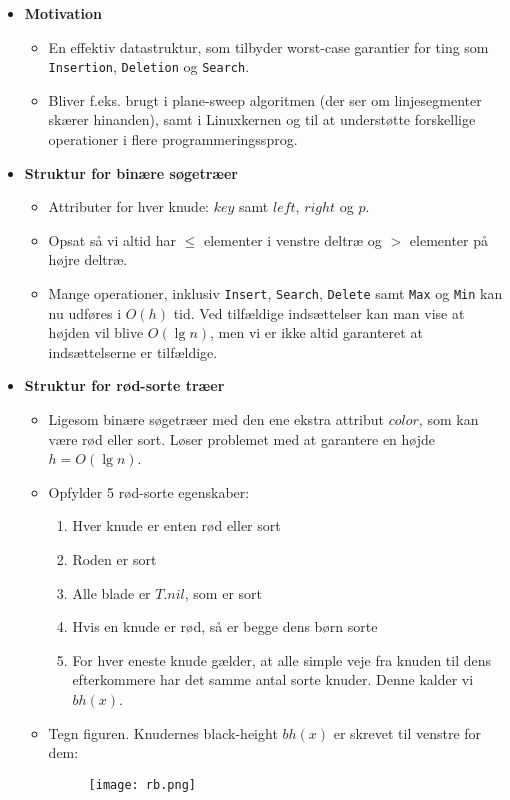 \begin{itemize}
\item \textbf{Motivation}
\begin{itemize}
	\item En effektiv datastruktur, som tilbyder worst-case garantier for ting som \texttt{Insertion}, \texttt{Deletion} og \texttt{Search}.
	\item Bliver f.eks. brugt i plane-sweep algoritmen (der ser om linjesegmenter skærer hinanden), samt i Linuxkernen og til at understøtte forskellige operationer i flere programmeringssprog.
\end{itemize}
	
	
\item \textbf{Struktur for binære søgetræer}
\begin{itemize}
	\item Attributer for hver knude: $key$ samt $left$, $right$ og $p$.
	\item Opsat så vi altid har $\leq$ elementer i venstre deltræ og $>$ elementer på højre deltræ.
	\item Mange operationer, inklusiv \texttt{Insert}, \texttt{Search}, \texttt{Delete} samt \texttt{Max} og \texttt{Min} kan nu udføres i $O(h)$ tid. Ved tilfældige indsættelser kan man vise at højden vil blive $O(\lg n)$, men vi er ikke altid garanteret at indsættelserne er tilfældige.
\end{itemize}

\item \textbf{Struktur for rød-sorte træer}
\begin{itemize}
	\item Ligesom binære søgetræer med den ene ekstra attribut $color$, som kan være rød eller sort. Løser problemet med at garantere en højde $h = O(\lg n)$.
	\item Opfylder 5 rød-sorte egenskaber:
	\begin{enumerate}
		\item Hver knude er enten rød eller sort
		\item Roden er sort
		\item Alle blade er $T.nil$, som er sort
		\item Hvis en knude er rød, så er begge dens børn sorte
		\item For hver eneste knude gælder, at alle simple veje fra knuden til dens efterkommere har det samme antal sorte knuder. Denne kalder vi $bh(x)$.
	\end{enumerate}
	\item Tegn figuren. Knudernes black-height $bh(x)$ er skrevet til venstre for dem:
	\begin{figure}[H]
		\begin{center}
			\texttt{[image: rb.png]}
		\end{center}
		\label{fig:rb}
	\end{figure}
\end{itemize}



\end{itemize}
